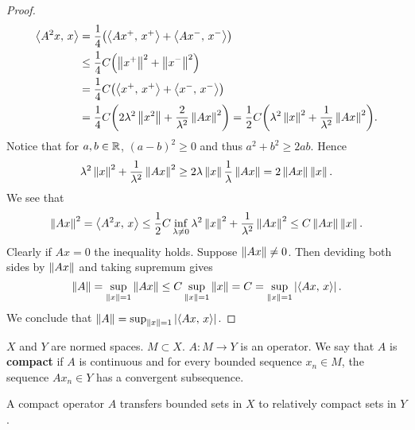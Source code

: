 \begin{proof}
\begin{equation*}
\begin{split}
            \inp{A^2x}{x} &= \frac{1}{4}\pth{\inp{Ax^+}{x^+} + \inp{Ax^-}{x^-}} \\
            &\leq \frac{1}{4}C\pth{\norm{x^+}^2 + \norm{x^-}^2} \\
            &= \frac{1}{4}C\pth{\inp{x^+}{x^+} + \inp{x^-}{x^-}} \\
            &= \frac{1}{4}C\pth{2\lambda^2\norm{x^2} + \frac{2}{\lambda^2}\norm{Ax}^2}
            = \frac{1}{2}C\pth{\lambda^2\norm{x}^2 + \frac{1}{\lambda^2}\norm{Ax}^2}.
        \end{split}
    \end{equation*}
    Notice that for $a,b\in\mathbb{R}$, $(a-b)^2\geq 0$ and thus $a^2 + b^2\geq 2ab$. Hence 
    \begin{equation*}
        \lambda^2\left\lVert {x} \right\rVert^2 + \frac{1}{\lambda^2}\left\lVert {Ax} \right\rVert^2 \geq 2\lambda\left\lVert {x} \right\rVert\frac{1}{\lambda}\left\lVert {Ax} \right\rVert 
        = 2\left\lVert {Ax} \right\rVert\left\lVert {x} \right\rVert.
    \end{equation*}
    We see that 
    \begin{equation*}
        \left\lVert {Ax} \right\rVert^2 = \left\langle {A^2x},\, {x} \right\rangle \leq \frac{1}{2}C\inf_{\lambda\neq 0} \lambda^2\left\lVert {x} \right\rVert^2 + \frac{1}{\lambda^2}\left\lVert {Ax} \right\rVert^2 
        \leq C\left\lVert {Ax} \right\rVert\left\lVert {x} \right\rVert.
    \end{equation*}
    Clearly if $Ax=0$ the inequality holds. Suppose $\left\lVert {Ax} \right\rVert \neq 0$. Then 
    deviding both sides by $\left\lVert {Ax} \right\rVert$ and taking supremum gives 
    \begin{equation*}
        \left\lVert {A} \right\rVert = \sup_{\left\lVert {x} \right\rVert = 1}\left\lVert {Ax} \right\rVert \leq C\sup_{\left\lVert {x} \right\rVert = 1}\left\lVert {x} \right\rVert 
        = C = \sup_{\left\lVert {x} \right\rVert = 1}\left\lvert {\left\langle {Ax},\, {x} \right\rangle} \right\rvert.
    \end{equation*}
    We conclude that $\left\lVert {A} \right\rVert = \sup_{\left\lVert {x} \right\rVert = 1} \left\lvert {\left\langle {Ax},\, {x} \right\rangle} \right\rvert$.
\end{proof}

\begin{definition}
    $X$ and $Y$ are normed spaces. $M\subset X$. $A:M\to Y$ is an operator. We 
    say that $A$ is \textbf{compact} if $A$ is continuous and for every bounded 
    sequence $x_n\in M$, the sequence $Ax_n\in Y$ has a convergent subsequence.
\end{definition}
\begin{remark}
    A compact operator $A$ transfers bounded sets in $X$ to relatively compact 
    sets in $Y$.
\end{remark}


